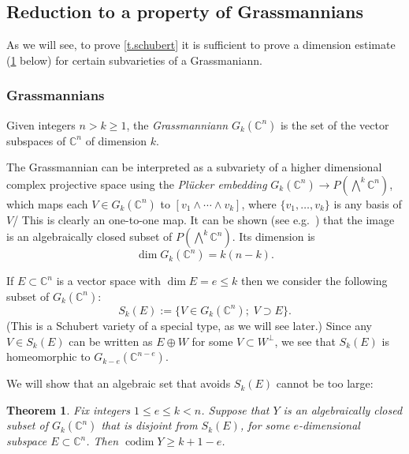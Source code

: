 \documentclass[10pt, a4paper]{amsart}
\theoremstyle{plain}
\newtheorem{thm}[lemma]{Theorem}
\theoremstyle{definition}
\theoremstyle{remark}
\theoremstyle{note}
\numberwithin{equation}{section}
\begin{document}
\subsection{Reduction to a property of Grassmannians} \label{ss.reduction}

As we will see, to prove \cref{t.schubert} 
it is sufficient to prove a dimension estimate (\cref{t.schubert2} below) 
for certain subvarieties of a Grassmaniann.

\subsubsection{Grassmannians}

Given integers $n > k \ge 1$, the \emph{Grassmanniann} $G_k({\mathbb{C}}^n)$ 
is the set of the vector subspaces of ${\mathbb{C}}^{n}$ of 
dimension $k$.

The Grassmannian can be interpreted as a subvariety of a higher dimensional complex projective space
using the \emph{Pl\"ucker embedding} $G_k({\mathbb{C}}^n) \to P(\bigwedge^k {\mathbb{C}}^n)$,
which maps each $V \in G_k({\mathbb{C}}^n)$ to $[v_1 \wedge \cdots \wedge  v_k]$,
where $\{v_1, \dots, v_k\}$ is any basis of $V$/
This is clearly an one-to-one map.
It can be shown (see e.g.~\cite[p.~61ff]{Harris}) that the image is 
an algebraically closed subset 
of $P(\bigwedge^k {\mathbb{C}}^n)$.
Its dimension is 
\begin{equation}\label{e.dim_G}
\dim G_k({\mathbb{C}}^n) = k(n-k).
\end{equation}

If $E \subset {\mathbb{C}}^n$ is a vector space with $\dim E = e \le k$ then 
we consider the following subset of $G_k({\mathbb{C}}^n)$: 
\begin{equation}\label{e.special schubert}
S_k(E) := \big\{V \in G_k({\mathbb{C}}^n) ; \; V \supset E \big\}.
\end{equation}
(This is a Schubert variety of a special type, as we will see later.)
Since any $V \in S_k(E)$ can be written as $E \oplus W$ for some $V \subset W^\perp$,
we see that $S_k(E)$ is homeomorphic to $G_{k-e}({\mathbb{C}}^{n-e})$.

We will 
show that an algebraic set that avoids $S_k(E)$ cannot be too large:

\begin{thm}\label{t.schubert2}
Fix integers $1 \le e \le k < n$. 
Suppose that $Y$ is an algebraically closed subset of $G_k({\mathbb{C}}^n)$
that is disjoint from $S_k(E)$,
for some $e$-dimensional subspace $E \subset {\mathbb{C}}^n$.
Then $\operatorname{codim} Y \ge k + 1 - e$.
\end{thm}
\end{document}
